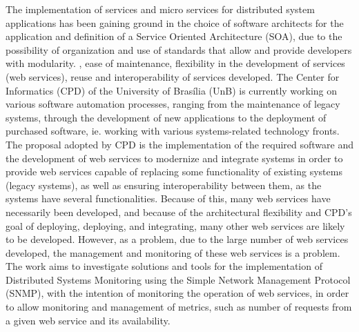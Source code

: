 The implementation of services and micro services for distributed system applications has been gaining ground in the choice of software architects for the application and definition of a Service Oriented Architecture (SOA), due to the possibility of organization and use of standards that allow and provide developers with modularity. , ease of maintenance, flexibility in the development of services (web services), reuse and interoperability of services developed. The Center for Informatics (CPD) of the University of Brasília (UnB) is currently working on various software automation processes, ranging from the maintenance of legacy systems, through the development of new applications to the deployment of purchased software, ie. working with various systems-related technology fronts. The proposal adopted by CPD is the implementation of the required software and the development of web services to modernize and integrate systems in order to provide web services capable of replacing some functionality of existing systems (legacy systems), as well as ensuring interoperability between them, as the systems have several functionalities. Because of this, many web services have necessarily been developed, and because of the architectural flexibility and CPD's goal of deploying, deploying, and integrating, many other web services are likely to be developed. However, as a problem, due to the large number of web services developed, the management and monitoring of these web services is a problem. The work aims to investigate solutions and tools for the implementation of Distributed Systems Monitoring using the Simple Network Management Protocol (SNMP), with the intention of monitoring the operation of web services, in order to allow monitoring and management of metrics, such as number of requests from a given web service and its availability.